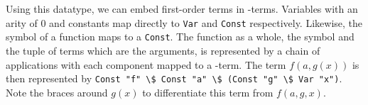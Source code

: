 
Using this datatype, we can embed first-order terms in \lam -terms. Variables with an arity of $0$ and constants map directly to \verb!Var! and \verb!Const! respectively. Likewise, the symbol of a function maps to a \verb!Const!. The function as a whole, the symbol and the tuple of terms which are the arguments, is represented by a chain of applications with each component mapped to a \lam -term. The term $f(a,g(x))$ is then represented by \verb!Const "f" \$ Const "a" \$ (Const "g" \$ Var "x")!. Note the braces around $g(x)$ to differentiate this term from $f(a,g,x)$.


